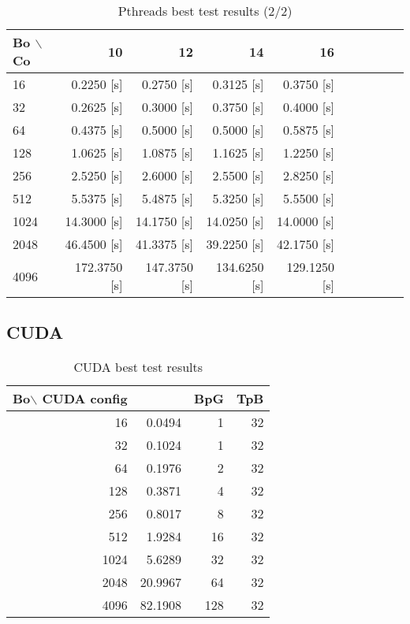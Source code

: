     \begin{table}[h!]
        \centering
        \small
        \begin{tabular}{|l|r|r|r|r|r|r|r|r|r|}
            \hline
            Bo $\backslash$Co & 10           & 12           & 14           & 16 \\\hline
            16                & 0.2250 [s]   & 0.2750 [s]   & 0.3125 [s]   & 0.3750 [s] \\\hline
            32                & 0.2625 [s]   & 0.3000 [s]   & 0.3750 [s]   & 0.4000 [s] \\\hline
            64                & 0.4375 [s]   & 0.5000 [s]   & 0.5000 [s]   & 0.5875 [s] \\\hline
            128               & 1.0625 [s]   & 1.0875 [s]   & 1.1625 [s]   & 1.2250 [s] \\\hline
            256               & 2.5250 [s]   & 2.6000 [s]   & 2.5500 [s]   & 2.8250 [s] \\\hline
            512               & 5.5375 [s]   & 5.4875 [s]   & 5.3250 [s]   & 5.5500 [s] \\\hline
            1024              & 14.3000 [s]  & 14.1750 [s]  & 14.0250 [s]  & 14.0000 [s] \\\hline
            2048              & 46.4500 [s]  & 41.3375 [s]  & 39.2250 [s]  & 42.1750 [s] \\\hline
            4096              & 172.3750 [s] & 147.3750 [s] & 134.6250 [s] & 129.1250 [s] \\\hline
        \end{tabular}
        \caption{Pthreads best test results (2/2)}
        \label{tab:pthreads}
    \end{table}



\subsection{CUDA}

    \begin{table}[h!]
        \centering
        \small
        \begin{tabular}{|r|r|r|r|}
            \hline
            Bo$\backslash$ CUDA config & & BpG & TpB \\ \hline
            16    &   0.0494   &   1  &  32 \\\hline
            32    &   0.1024   &   1  &  32 \\\hline
            64    &   0.1976   &   2  &  32 \\\hline
            128   &   0.3871   &   4  &  32 \\\hline
            256   &   0.8017   &   8  &  32 \\\hline
            512   &   1.9284   &  16  &  32 \\\hline
            1024  &   5.6289   &  32  &  32 \\\hline
            2048  &  20.9967   &  64  &  32 \\\hline
            4096  &  82.1908   & 128  &  32 \\\hline
        \end{tabular}
        \caption{CUDA best test results}
        \label{tab:cuda}
    \end{table}
